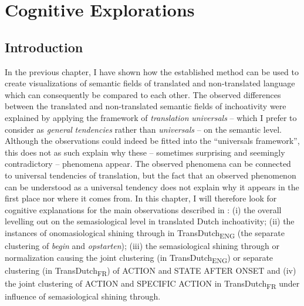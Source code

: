 \chapter{Cognitive Explorations}
\section{Introduction}
\label{sec:5.1}  
In the previous chapter, I have shown how the established method can be used to create visualizations of semantic fields of translated and non-translated language which can consequently be compared to each other. The observed differences between the translated and non-translated semantic fields of inchoativity were explained by applying the framework of \textit{translation} \textit{universals} – which I prefer to consider as \textit{general} \textit{tendencies} rather than \textit{universals} – on the semantic level. Although the observations could indeed be fitted into the “universals framework”, this does not as such explain why these – sometimes surprising and seemingly contradictory – phenomena appear. The observed phenomena can be connected to universal tendencies of translation, but the fact that an observed phenomenon can be understood as a universal tendency does not explain why it appears in the first place nor where it comes from. In this chapter, I will therefore look for cognitive explanations for the main observations described in : (i) the overall levelling out on the semasiological level in translated Dutch inchoativity; (ii) the instances of onomasiological shining through in TransDutch\textsubscript{ENG} (the separate clustering of \textit{begin} and \textit{opstarten}); (iii) the semasiological shining through or normalization causing the joint clustering (in TransDutch\textsubscript{ENG}) or separate clustering (in TransDutch\textsubscript{FR}) of ACTION and STATE AFTER ONSET and (iv) the joint clustering of ACTION and SPECIFIC ACTION in TransDutch\textsubscript{FR} under influence of semasiological shining through.

